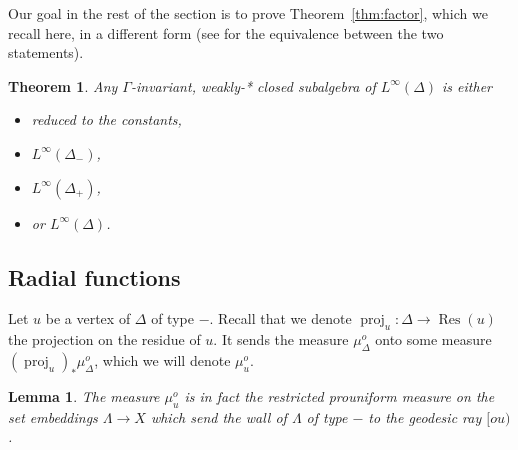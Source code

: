 \documentclass[a4paper, 11pt]{article}
\theoremstyle{plain}
\newtheorem{theorem}[proposition]{Theorem}
\newtheorem{lemma}[proposition]{Lemma}
\theoremstyle{definition}
\theoremstyle{remark}
\DeclareMathOperator{\proj}{proj}
\DeclareMathOperator{\Res}{Res}
\begin{document}
Our goal in the rest of the section is  to prove Theorem~\ref{thm:factor}, which we recall here, in a different form (see \cite[Theorem 3.3.4]{AnantharamanPopa} for the equivalence between the two statements).

\begin{theorem}\label{thm:subalgebras}
Any $\Gamma$-invariant, weakly-* closed subalgebra of $L^\infty(\Delta)$ is either 
\begin{itemize}
\item reduced to the constants,
\item $L^\infty(\Delta_-)$,
\item $L^\infty(\Delta_+)$,
\item or $L^\infty(\Delta)$.
\end{itemize}
\end{theorem}

\subsection{Radial functions}


Let $u$ be a vertex of $\Delta$ of type $-$. Recall that we denote $\proj_u:\Delta\to\Res(u)$ the projection on the residue of $u$. It sends the measure $\mu_\Delta^o$ onto some measure $(\proj_u)_*\mu_\Delta^o$, which we will denote $\mu_u ^o$. 

\begin{lemma}\label{lem:projmp}
The measure $\mu_u^o$ is in fact the restricted prouniform measure on the set  embeddings $\Lambda\to X$ which send the wall of $\Lambda$ of type $-$ to the geodesic ray $[ou)$.
\end{lemma}
\end{document}
